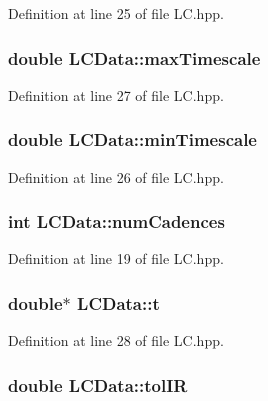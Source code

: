 Definition at line 25 of file L\-C.\-hpp.

\hypertarget{class_l_c_data_a3373ecbb559da5356ed987e378b80a08}{
\subsubsection[{max\-Timescale}]{\setlength{\rightskip}{0pt plus 5cm}double L\-C\-Data\-::max\-Timescale}}\label{class_l_c_data_a3373ecbb559da5356ed987e378b80a08}


Definition at line 27 of file L\-C.\-hpp.

\hypertarget{class_l_c_data_a71baee20f31c307d57b6087939a18a2d}{
\subsubsection[{min\-Timescale}]{\setlength{\rightskip}{0pt plus 5cm}double L\-C\-Data\-::min\-Timescale}}\label{class_l_c_data_a71baee20f31c307d57b6087939a18a2d}


Definition at line 26 of file L\-C.\-hpp.

\hypertarget{class_l_c_data_a137abcea32e2d608a6b7687e583c18fe}{
\subsubsection[{num\-Cadences}]{\setlength{\rightskip}{0pt plus 5cm}int L\-C\-Data\-::num\-Cadences}}\label{class_l_c_data_a137abcea32e2d608a6b7687e583c18fe}


Definition at line 19 of file L\-C.\-hpp.

\hypertarget{class_l_c_data_a65e9d543136280889767d3411763c7cd}{
\subsubsection[{t}]{\setlength{\rightskip}{0pt plus 5cm}double$\ast$ L\-C\-Data\-::t}}\label{class_l_c_data_a65e9d543136280889767d3411763c7cd}


Definition at line 28 of file L\-C.\-hpp.

\hypertarget{class_l_c_data_a7abd754c3405413fd35b44f8da911b2a}{
\subsubsection[{tol\-I\-R}]{\setlength{\rightskip}{0pt plus 5cm}double L\-C\-Data\-::tol\-I\-R}}\label{class_l_c_data_a7abd754c3405413fd35b44f8da911b2a}


